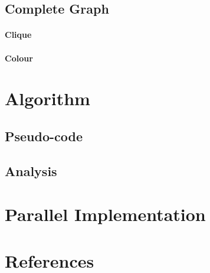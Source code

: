 \documentclass[•]{article}
\begin{document}
\subsection{Complete Graph}
\paragraph{Clique}
\paragraph{Colour}

\section{Algorithm}
\subsection{Pseudo-code}
\subsection{Analysis}

\section{Parallel Implementation}

\section{References}
\end{document}
